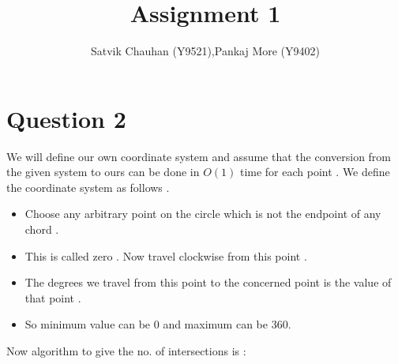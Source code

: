 \documentclass{article}
\title{Assignment 1}
\author{Satvik Chauhan (Y9521),Pankaj More (Y9402)}
\date{}
\begin{document}
\maketitle
\section*{Question 2}
We will define our own coordinate system and assume that the conversion from the given system to ours can be done in $O(1)$ time for each point . We define the coordinate system as follows . 
\begin{itemize}
\item Choose any arbitrary point on the circle which is not the endpoint of any chord .
\item This is called zero . Now travel clockwise from this point .
\item The degrees we travel from this point to the concerned point is the value of that point . 
\item So minimum value can be 0 and maximum can be 360. 
\end{itemize}
Now algorithm to give the no. of intersections is : \\
\end{document}
